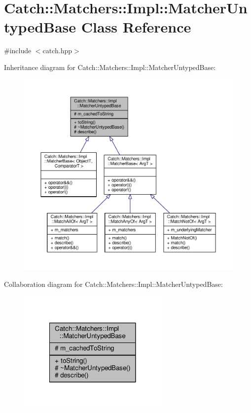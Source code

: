 \hypertarget{class_catch_1_1_matchers_1_1_impl_1_1_matcher_untyped_base}{\section{Catch\-:\-:Matchers\-:\-:Impl\-:\-:Matcher\-Untyped\-Base Class Reference}
\label{class_catch_1_1_matchers_1_1_impl_1_1_matcher_untyped_base}
}


{\ttfamily \#include $<$catch.\-hpp$>$}



Inheritance diagram for Catch\-:\-:Matchers\-:\-:Impl\-:\-:Matcher\-Untyped\-Base\-:
\nopagebreak
\begin{figure}[H]
\begin{center}
\leavevmode
\includegraphics[width=350pt]{class_catch_1_1_matchers_1_1_impl_1_1_matcher_untyped_base__inherit__graph}
\end{center}
\end{figure}


Collaboration diagram for Catch\-:\-:Matchers\-:\-:Impl\-:\-:Matcher\-Untyped\-Base\-:
\nopagebreak
\begin{figure}[H]
\begin{center}
\leavevmode
\includegraphics[width=210pt]{class_catch_1_1_matchers_1_1_impl_1_1_matcher_untyped_base__coll__graph}
\end{center}
\end{figure}
